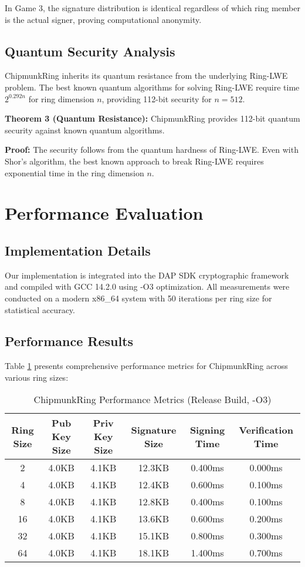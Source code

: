 \documentclass[11pt,a4paper]{article}
\begin{document}
In Game 3, the signature distribution is identical regardless of which ring member is the actual signer, proving computational anonymity.

\subsection{Quantum Security Analysis}

ChipmunkRing inherits its quantum resistance from the underlying Ring-LWE problem. The best known quantum algorithms for solving Ring-LWE require time $2^{0.292n}$ for ring dimension $n$, providing 112-bit security for $n = 512$.

\textbf{Theorem 3 (Quantum Resistance):} ChipmunkRing provides 112-bit quantum security against known quantum algorithms.

\textbf{Proof:} The security follows from the quantum hardness of Ring-LWE. Even with Shor's algorithm, the best known approach to break Ring-LWE requires exponential time in the ring dimension $n$.

\section{Performance Evaluation}

\subsection{Implementation Details}

Our implementation is integrated into the DAP SDK cryptographic framework and compiled with GCC 14.2.0 using -O3 optimization. All measurements were conducted on a modern x86\_64 system with 50 iterations per ring size for statistical accuracy.

\subsection{Performance Results}

Table \ref{tab:performance} presents comprehensive performance metrics for ChipmunkRing across various ring sizes:

\begin{table}[h]
\centering
\caption{ChipmunkRing Performance Metrics (Release Build, -O3)}
\label{tab:performance}
\begin{tabular}{@{}cccccc@{}}
\toprule
Ring Size & Pub Key Size & Priv Key Size & Signature Size & Signing Time & Verification Time \\
\midrule
2 & 4.0KB & 4.1KB & 12.3KB & 0.400ms & 0.000ms \\
4 & 4.0KB & 4.1KB & 12.4KB & 0.600ms & 0.100ms \\
8 & 4.0KB & 4.1KB & 12.8KB & 0.400ms & 0.100ms \\
16 & 4.0KB & 4.1KB & 13.6KB & 0.600ms & 0.200ms \\
32 & 4.0KB & 4.1KB & 15.1KB & 0.800ms & 0.300ms \\
64 & 4.0KB & 4.1KB & 18.1KB & 1.400ms & 0.700ms \\
\bottomrule
\end{tabular}
\end{table}
\end{document}
